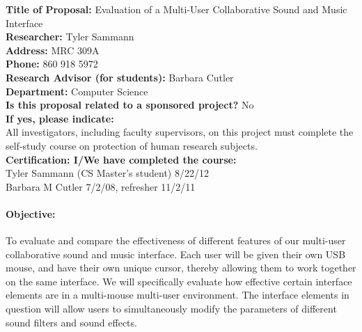 \documentclass[10pt]{article}
\begin{document}
\noindent
{\bf Title of Proposal:}  Evaluation of a Multi-User Collaborative Sound and Music Interface\\
{\bf Researcher:}   Tyler Sammann\\
{\bf Address:}  MRC 309A\\
{\bf Phone:} 860 918 5972\\
{\bf Research Advisor (for students):}  Barbara Cutler \\
{\bf Department:}  Computer Science \\
{\bf Is this proposal related to a sponsored project?}  No \\
{\bf If yes,  please indicate:}  \\

\noindent
All investigators, including faculty supervisors, on this project must
complete the self-study course on protection of human research
subjects. \\
{\bf Certification:  I/We have completed the course:} \\
Tyler Sammann (CS Master's student) 8/22/12 \\
Barbara M Cutler 7/2/08, refresher 11/2/11

\paragraph{Objective:}
%
To evaluate and compare the effectiveness of different features of our multi-user collaborative sound and music interface.
Each user will be given their own USB mouse, and have their own unique cursor, thereby allowing them to 
work together on the same interface. We will specifically evaluate how effective certain interface elements are in 
a multi-mouse multi-user environment. The interface elements in question will allow users to simultaneously modify the parameters 
of different sound filters and sound effects.
\end{document}
